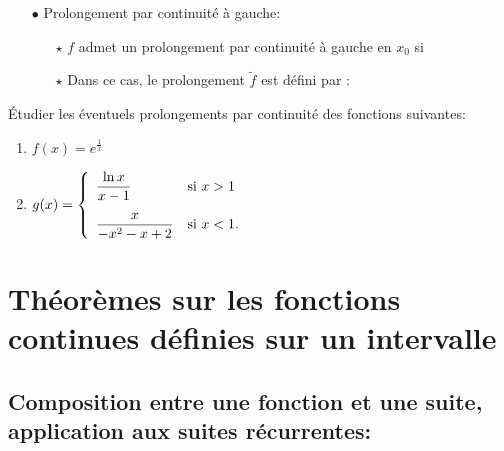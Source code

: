 \documentclass[a4paper, 11pt]{article}
\begin{document}
{{\begin{prop}
\begin{itemize}
\begin{itemize}
			      \end{itemize}
			\item[$\bullet$] Prolongement par continuit\'e \`{a} gauche:
			      \begin{itemize}
				      \item[$\star$] $f$ admet un prolongement par continuit\'e \`a gauche en $x_0$ si \dotfill
				      \item[$\star$] Dans ce cas, le prolongement $\tilde f$ est d\'efini par :
				            \vspace{1.5cm}

			      \end{itemize}
		\end{itemize}
	\end{prop}

}

{\footnotesize \begin{exercice} \'Etudier les \'eventuels prolongements par continuit\'e des fonctions suivantes:
		\begin{enumerate}
			\item $f(x)=e^{\frac{1}{x}}$
			\item $g(x)=\left\lbrace\begin{array}{ll}
					      \ddp\frac{\ln{x}}{x-1} & \hbox{si}\ x>1\vsec \\
					      \ddp\frac{x}{-x^2-x+2} & \hbox{si}\ x<1.
				      \end{array}\right.$
		\end{enumerate}
	\end{exercice}}


% 
\section{Th\'eor\`emes sur les fonctions continues d\'efinies sur un intervalle}

\subsection{Composition entre une fonction et une suite, application aux suites r\'ecurrentes:}

}
\end{document}
